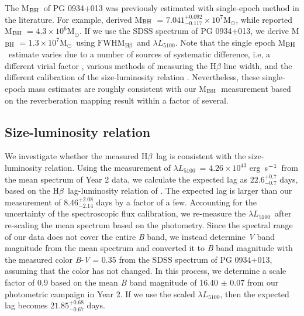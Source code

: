 \documentclass[iop]{emulateapj}
\newcommand{\Hb}{\rm H{$\beta$}}
\newcommand{\mbh}{M$_{\rm BH}$}
\newcommand{\ergs}{erg~s$^{\rm -1}$}
\newcommand{\msun}{M$_{\odot}$}
\newcommand{\lam}{$\lambda$}
\newcommand{\fwhb}{\ensuremath{\mathrm{FWHM}_\mathrm{H{\beta}}}}
\newcommand{\lf}{\ensuremath{L_{5100}}}
\begin{document}
The \mbh\ of PG 0934+013 was previously estimated with single-epoch method in the literature. For example, \cite{Vestergaard2006} derived \mbh\ = $7.041^{+0.092}_{-0.117} \times 10^{7}$\msun, while \cite{Veroncetty2001} reported \mbh\ = $4.3 \times 10^{6}$\msun.
If we use the SDSS spectrum of PG 0934+013, we derive \mbh\ = $1.3 \times 10^{7}$\msun\ using \fwhb\ and \lam\lf. Note that the single epoch \mbh\ estimate varies due to a number of sources of systematic difference, i.e, a different virial factor \citep[see][]{Park2012}, various methods of measuring the H$\beta$ line width, and the different calibration of the size-luminosity relation \citep[see][]{Bentz2013}. Nevertheless, these single-epoch mass estimates are roughly consistent with our \mbh\ measurement based on the reverberation mapping result within a factor of several.

\subsection{Size-luminosity relation}

We investigate whether the measured \Hb\ lag is consistent with the size-luminosity relation.
Using the measurement of $\lambda$\lf\ = $4.26 \times 10^{43}$ \ergs\ from the mean spectrum of Year 2 data, we calculate the expected lag as $22.6^{+0.7}_{-0.7}$ days, based on the \Hb\ lag-luminosity relation of \citet{Bentz2013}. 
The expected lag is larger than our measurement of $8.46^{+2.08}_{-2.14}$  days by a factor of a few.
Accounting for the uncertainty of the spectroscopic flux calibration, we re-measure the $\lambda$\lf\ after re-scaling the mean spectrum based on the photometry. Since the spectral range of our data does not cover the entire \textit{B} band, we instead determine \textit{V} band magnitude from the mean spectrum and converted it to \textit{B} band magnitude with the measured color \textit{B}-\textit{V} = 0.35 from the SDSS spectrum of PG 0934+013, assuming that the color has not changed.
In this process, we determine a scale factor of 0.9 based on the mean \textit{B} band magnitude of 16.40 $\pm$ 0.07  from our photometric campaign in Year 2. If we use the scaled $\lambda$\lf, then the expected lag becomes $21.85^{+0.68}_{-0.67}$ days. 
 
\end{document}
